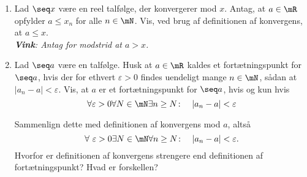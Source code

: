 \begin{opg}\hfill
\begin{enumerate}
	\item \label{klemme} Lad $\seq x$ være en reel talfølge, der konvergerer mod $x$. Antag, at $a \in \mR$ opfylder $a \leq x_n$ for alle $n \in \mN$. Vis, ved brug af definitionen af konvergens, at $a \leq x$.\\
	 \emph{\textbf{Vink}: Antag for modstrid at $a > x$.}
	
    \item Lad $\seq a$ være en talfølge. Husk at $a\in\mR$ kaldes et fortætningspunkt for $\seq a$, hvis der for ethvert $\varepsilon>0$ findes uendeligt mange $n\in\mN$, sådan at $|a_n-a|<\varepsilon$. Vis, at $a$ er et fortætningspunkt for $\seq a$,  hvis og kun hvis
    $$ \forall\varepsilon>0\forall N\in\mN\exists n \geq N\colon\quad  |a_n -a|< \varepsilon $$
    
    Sammenlign dette med definitionen af konvergens mod $a$, altså
    $$ \forall\ \varepsilon>0\exists N\in\mN\forall n \geq N\colon\quad|a_n -a|< \varepsilon. $$
    Hvorfor er definitionen af konvergens strengere end definitionen af fortætningspunkt? Hvad er forskellen?
\end{enumerate}
\end{opg}

